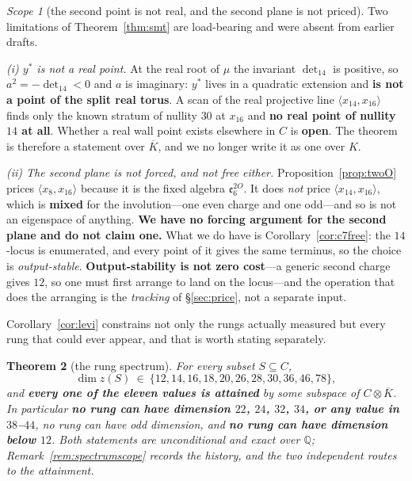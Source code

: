 \documentclass[11pt,reqno]{amsart}
\theoremstyle{plain}
\newtheorem{theorem}{Theorem}[section]
\theoremstyle{definition}
\theoremstyle{remark}
\newtheorem{scope}[theorem]{Scope}
\newcommand{\Q}{\mathbb{Q}}
\newcommand{\ee}{\mathfrak{e}}
\begin{document}
\begin{scope}[the second point is not real, and the second plane is not priced]\label{sc:ystar}
Two limitations of Theorem~\ref{thm:smt} are load-bearing and were absent from earlier
drafts.

\emph{(i) $y^*$ is not a real point.} At the real root of $\mu$ the invariant
$\det_{14}$ is positive, so $a^2=-\det_{14}<0$ and $a$ is imaginary: $y^*$ lives in a
quadratic extension and \textbf{is not a point of the split real torus}. A scan of the
real projective line $\langle x_{14},x_{16}\rangle$ finds only the known stratum of
nullity $30$ at $x_{16}$ and \textbf{no real point of nullity $14$ at all}. Whether a
real wall point exists elsewhere in $C$ is \textbf{open}. The theorem is therefore a
statement over $\overline K$, and we no longer write it as one over $K$.

\emph{(ii) The second plane is not forced, and not free either.}
Proposition~\ref{prop:twoO} prices $\langle x_8,x_{16}\rangle$ because it is the fixed
algebra $\ee_6^{2O}$. It does \emph{not} price $\langle x_{14},x_{16}\rangle$, which is
\textbf{mixed} for the involution---one even charge and one odd---and so is not an
eigenspace of anything. \textbf{We have no forcing argument for the second plane and do
not claim one.} What we do have is Corollary~\ref{cor:c7free}: the $14$-locus is
enumerated, and every point of it gives the same terminus, so the choice is
\emph{output-stable}. \textbf{Output-stability is not zero cost}---a generic second
charge gives $12$, so one must first arrange to land on the locus---and the operation
that does the arranging is the \emph{tracking} of \S\ref{sec:price}, not a separate
input.
\end{scope}

Corollary~\ref{cor:levi} constrains not only the rungs actually measured but every rung
that could ever appear, and that is worth stating separately.

\begin{theorem}[the rung spectrum]\label{thm:rungspec}
For every subset $S\subseteq C$,
\[
   \dim z(S)\ \in\ \{12,14,16,18,20,26,28,30,36,46,78\},
\]
and \textbf{every one of the eleven values is attained} by some subspace of
$C\otimes\overline K$. In particular \textbf{no rung can have dimension $22$, $24$, $32$,
$34$, or any value in $38$--$44$}, no rung can have odd dimension, and \textbf{no rung can
have dimension below $12$}. Both statements are unconditional and exact over $\Q$;
Remark~\ref{rem:spectrumscope} records the history, and the two independent routes to the
attainment.
\end{theorem}
\end{document}
